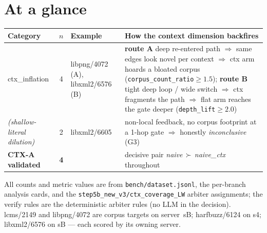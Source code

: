 \documentclass[11pt]{article}
\begin{document}
\section*{At a glance}
\begin{center}\small
\begin{tabular}{@{}p{3.2cm}clp{5.0cm}@{}}
\toprule
\textbf{Category} & \textbf{$n$} & \textbf{Example} & \textbf{How the context dimension backfires} \\
\midrule
ctx\_inflation & 4 & libpng/4072 (A), libxml2/6576 (B) & \textbf{route A} deep re-entered path $\Rightarrow$ same edges look novel per context $\Rightarrow$ ctx arm hoards a bloated corpus (\texttt{corpus\_count\_ratio}$\ge1.5$); \textbf{route B} tight deep loop / wide switch $\Rightarrow$ ctx fragments the path $\Rightarrow$ flat arm reaches the gate deeper (\texttt{depth\_lift}$\ge2.0$) \\
\midrule
\emph{(shallow-literal dilution)} & 2 & libxml2/6605 & non-local feedback, no corpus footprint at a 1-hop gate $\Rightarrow$ honestly \emph{inconclusive} (G3) \\
\midrule
\textbf{CTX-A validated} & \textbf{4} & & decisive pair \emph{naive}$\,\succ\,$\emph{naive\_ctx} throughout \\
\bottomrule
\end{tabular}
\end{center}

\noindent\footnotesize All counts and metric values are from
\texttt{bench/dataset.jsonl}, the per-branch analysis cards, and the
\texttt{step5b\_new\_v3/ctx\_coverage\_LW} arbiter assignments; the verify rules
are the deterministic arbiter rules (no LLM in the decision). lcms/2149 and
libpng/4072 are corpus targets on server~sB; harfbuzz/6124 on s4; libxml2/6576 on
sB --- each scored by its owning server.
\end{document}
